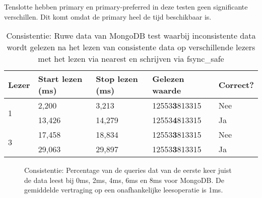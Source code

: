Tenslotte hebben primary en primary-preferred in deze testen geen significante verschillen. Dit komt omdat de primary heel de tijd beschikbaar is. 

\begin{table}
\centering
\begin{tabular}{l | l l l l}
Lezer & Start lezen (ms) & Stop lezen (ms) & Gelezen waarde & Correct? \\
\hline
\multirow{2}{*}{1} & 2,200 & 3,213 & 12553\textbf{3}813315 & Nee\\
 & 13,426 & 14,279 & 12553\textbf{4}813315 & Ja \\
 \multirow{2}{*}{3} & 17,458 & 18,834 & 12553\textbf{3}813315 & Nee\\
 & 29,063 & 29,897 & 12553\textbf{3}813315& Ja \\
\end{tabular}
\caption{Consistentie: Ruwe data van MongoDB test waarbij inconsistente data wordt gelezen na het lezen van consistente data op verschillende lezers met het lezen via nearest en schrijven via fsync\_safe}
\label{table:consistentie-mongodb-inconsistency}
\end{table}


\begin{figure}[!htf]

\caption{Consistentie: Percentage van de queries dat van de eerste keer juist de data leest bij 0ms, 2ms, 4ms, 6ms en 8ms voor MongoDB. De gemiddelde vertraging op een onafhankelijke leesoperatie is 1ms. }
\label{fig:consistentie-mongodb-correct}
\end{figure}


